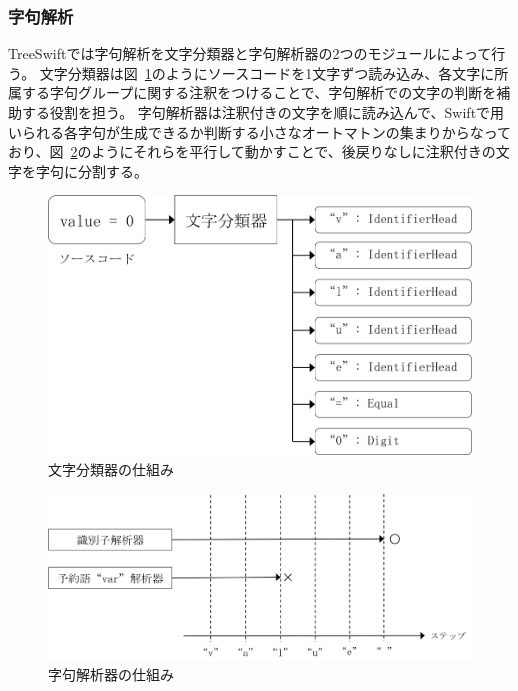 \subsubsection{字句解析}

TreeSwiftでは字句解析を文字分類器と字句解析器の2つのモジュールによって行う。
文字分類器は図~\ref{img:character-classifier}のようにソースコードを1文字ずつ読み込み、各文字に所属する字句グループに関する注釈をつけることで、字句解析での文字の判断を補助する役割を担う。
字句解析器は注釈付きの文字を順に読み込んで、Swiftで用いられる各字句が生成できるか判断する小さなオートマトンの集まりからなっており、図~\ref{img:lexical-analyzer}のようにそれらを平行して動かすことで、後戻りなしに注釈付きの文字を字句に分割する。

\begin{figure}
    \begin{center}
        \includegraphics[scale=0.8]{./img/character_classifier.png}
        \caption{文字分類器の仕組み}
        \label{img:character-classifier}
    \end{center}
\end{figure}

\begin{figure}
    \begin{center}
        \includegraphics[scale=0.8]{./img/lexical_analyzer.png}
        \caption{字句解析器の仕組み}
        \label{img:lexical-analyzer}
    \end{center}
\end{figure}

